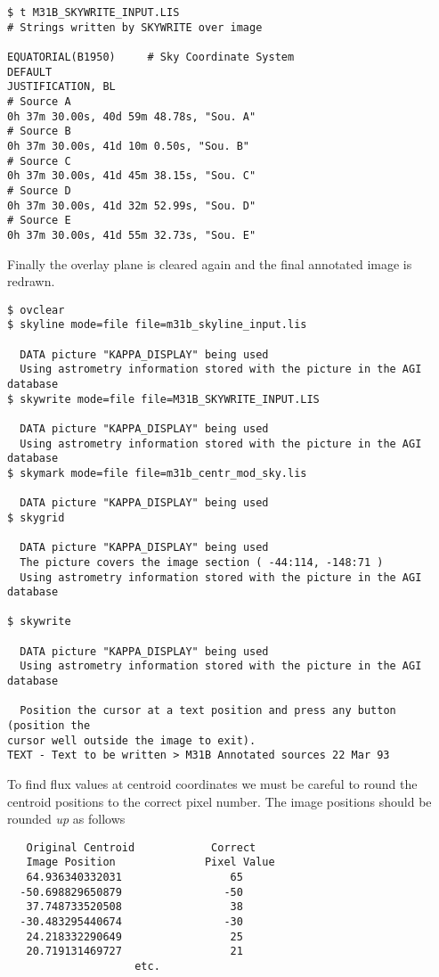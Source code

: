 \documentclass[twoside,11pt]{article}
\begin{document}
\begin{small}
\begin{verbatim}
$ t M31B_SKYWRITE_INPUT.LIS
# Strings written by SKYWRITE over image
 
EQUATORIAL(B1950)     # Sky Coordinate System
DEFAULT
JUSTIFICATION, BL
# Source A 
0h 37m 30.00s, 40d 59m 48.78s, "Sou. A"
# Source B
0h 37m 30.00s, 41d 10m 0.50s, "Sou. B"
# Source C
0h 37m 30.00s, 41d 45m 38.15s, "Sou. C"
# Source D
0h 37m 30.00s, 41d 32m 52.99s, "Sou. D"
# Source E
0h 37m 30.00s, 41d 55m 32.73s, "Sou. E"
\end{verbatim}
\end{small}
Finally the overlay plane is cleared again and the final annotated image is
redrawn.
\begin{small}
\begin{verbatim}
$ ovclear
$ skyline mode=file file=m31b_skyline_input.lis

  DATA picture "KAPPA_DISPLAY" being used
  Using astrometry information stored with the picture in the AGI database
$ skywrite mode=file file=M31B_SKYWRITE_INPUT.LIS

  DATA picture "KAPPA_DISPLAY" being used
  Using astrometry information stored with the picture in the AGI database
$ skymark mode=file file=m31b_centr_mod_sky.lis

  DATA picture "KAPPA_DISPLAY" being used
$ skygrid

  DATA picture "KAPPA_DISPLAY" being used
  The picture covers the image section ( -44:114, -148:71 )
  Using astrometry information stored with the picture in the AGI database

$ skywrite

  DATA picture "KAPPA_DISPLAY" being used
  Using astrometry information stored with the picture in the AGI database

  Position the cursor at a text position and press any button (position the
cursor well outside the image to exit).
TEXT - Text to be written > M31B Annotated sources 22 Mar 93
\end{verbatim}
\end{small}

To find flux values at centroid coordinates we must be careful to round the
centroid positions to the correct pixel number. The image positions should be
rounded {\em up} as follows 
\begin{small}
\begin{verbatim}
   Original Centroid            Correct
   Image Position              Pixel Value                      
   64.936340332031                 65
  -50.698829650879                -50
   37.748733520508                 38
  -30.483295440674                -30
   24.218332290649                 25
   20.719131469727                 21
                    etc.
\end{verbatim}
\end{small}
\end{document}
